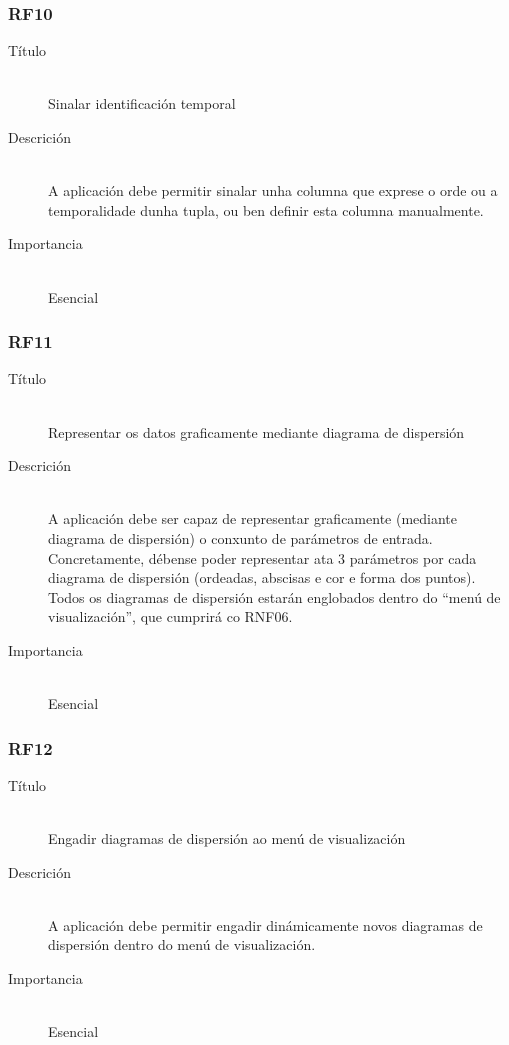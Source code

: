 \subsubsection*{RF10}
\begin{description}
\item[Título] \hfill \\
Sinalar identificación temporal
\item[Descrición] \hfill \\
A aplicación debe permitir sinalar unha columna que exprese o orde ou a temporalidade dunha tupla, ou ben definir esta columna manualmente.
\item[Importancia] \hfill \\
Esencial
\end{description}

\subsubsection*{RF11}
\begin{description}
\item[Título] \hfill \\
Representar os datos graficamente mediante diagrama de dispersión
\item[Descrición] \hfill \\
A aplicación debe ser capaz de representar graficamente (mediante diagrama de dispersión) o conxunto de parámetros de entrada. Concretamente, débense poder representar ata 3 parámetros por cada diagrama de dispersión (ordeadas, abscisas e cor e forma dos puntos). Todos os diagramas de dispersión estarán englobados dentro do ``menú de visualización'', que cumprirá co RNF06.
\item[Importancia] \hfill \\
Esencial
\end{description}

\subsubsection*{RF12}
\begin{description}
\item[Título] \hfill \\
Engadir diagramas de dispersión ao menú de visualización
\item[Descrición] \hfill \\
A aplicación debe permitir engadir dinámicamente novos diagramas de dispersión dentro do menú de visualización.
\item[Importancia] \hfill \\
Esencial
\end{description}

